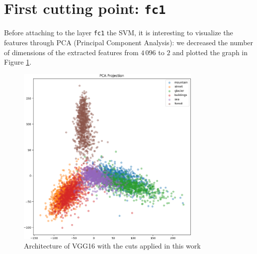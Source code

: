 \documentclass[compsoc]{IEEEtran}
\begin{document}
\begin{table}[]
\centering
{}
\caption{Number of VGG16's trainable parameters and dimensions of the extracted features at each cutting point}
\label{tab:dims}
\end{table}




\section{First cutting point: \texttt{fc1}}\label{sec:fc1}

Before attaching to the layer \texttt{fc1} the SVM, it is interesting to visualize the features through PCA (Principal Component Analysis): we decreased the number of dimensions of the extracted features from $4\,096$ to $2$ and plotted the graph in Figure \ref{fig:pca1}.

\begin{figure}[ht!]
\centering                                                                        
\includegraphics[width=3.5in]{../images/pca-1.png}
\captionsetup{justification=centering}                                                                                         
\caption{Architecture of VGG16 with the cuts applied in this work}
\label{fig:pca1}                                                                                                                               
\end{figure}
\end{document}
